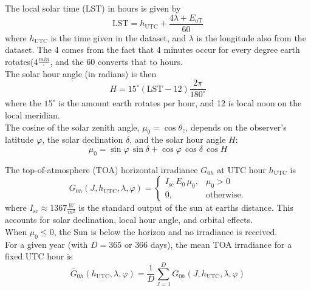 The local solar time (LST) in hours is given by
\begin{equation}
    \mathrm{LST} = h_{\mathrm{UTC}} + \frac{4\lambda + E_{\mathrm{oT}}}{60}
\end{equation}
where \(h_{\mathrm{UTC}}\) is the time given in the dataset, and \(\lambda\) is the longitude also from the dataset. The 4 comes from the fact that 4 minutes occur for every degree earth rotates(\(4 \frac{min}{^\circ}\), and the 60 converts that to hours.\\

The solar hour angle (in radians) is then
\begin{equation}
    H = 15^\circ  (\mathrm{LST} - 12)  \frac{2\pi}{180^\circ}
\end{equation}
where the \(15^\circ\) is the amount earth rotates per hour, and 12 is local noon on the local meridian.\\

The cosine of the solar zenith angle, \( \mu_0 = \cos\theta_z \), depends on the observer's latitude \( \varphi \), the solar declination \( \delta \), and the solar hour angle \( H \):
\begin{equation}
    \mu_0 = \sin\varphi \, \sin\delta + \cos\varphi \, \cos\delta \, \cos H
\end{equation}

The top-of-atmosphere (TOA) horizontal irradiance \( G_{0h} \) at UTC hour \(h_{\mathrm{UTC}}\) is
\begin{equation}
    G_{0h}(J, h_{\mathrm{UTC}}, \lambda, \varphi) =
    \begin{cases}
        I_{\mathrm{sc}} \, E_0 \, \mu_0, & \mu_0 > 0 \\
        0, & \text{otherwise.}
    \end{cases}
\end{equation}
where \(I_{\mathrm{sc}} \approx 1367\frac{W}{m^2}\) is the standard output of the sun at earths distance. This accounts for solar declination, local hour angle, and orbital effects.\\  
When \( \mu_0 \le 0 \), the Sun is below the horizon and no irradiance is received.\\

For a given year (with \( D = 365 \) or \( 366 \) days), the mean TOA irradiance for a fixed UTC hour is
\begin{equation}
    \bar{G}_{0h}(h_{\mathrm{UTC}}, \lambda, \varphi) =
    \frac{1}{D} \sum_{J=1}^{D} G_{0h}(J, h_{\mathrm{UTC}}, \lambda, \varphi)
\end{equation}

